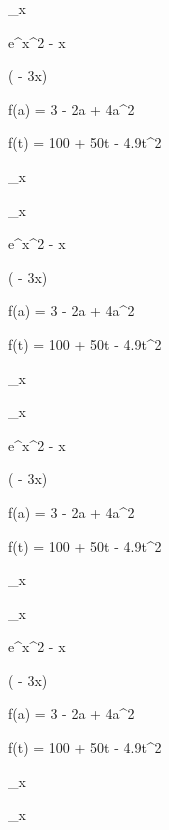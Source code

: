 \documentclass[11pt,a4paper]{article}
\begin{document}
\lim_{x } 

 

 e^{x^2 - x}

 

 ( - 3x)

f(a) = 3 - 2a + 4a^2

f(t) = 100 + 50t - 4.9t^2

\lim_{x } 

\lim_{x } 

 

 e^{x^2 - x}

 

 ( - 3x)

f(a) = 3 - 2a + 4a^2

f(t) = 100 + 50t - 4.9t^2

\lim_{x } 

\lim_{x } 

 

 e^{x^2 - x}

 

 ( - 3x)

f(a) = 3 - 2a + 4a^2

f(t) = 100 + 50t - 4.9t^2

\lim_{x } 

\lim_{x } 

 

 e^{x^2 - x}

 

 ( - 3x)

f(a) = 3 - 2a + 4a^2

f(t) = 100 + 50t - 4.9t^2

\lim_{x } 

\lim_{x } 

 
\end{document}
